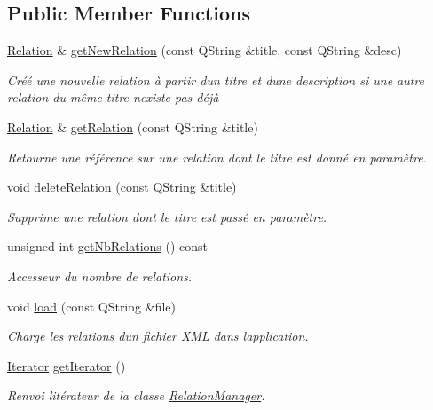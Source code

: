 \subsection*{Public Member Functions}
\begin{DoxyCompactItemize}
\item 
\hyperlink{class_relation}{Relation} \& \hyperlink{class_relation_manager_a1f9d556e0505105205e1fdb4905c4a80}{get\+New\+Relation} (const Q\+String \&title, const Q\+String \&desc)
\begin{DoxyCompactList}\small\item\em Créé une nouvelle relation à partir d\textquotesingle{}un titre et d\textquotesingle{}une description si une autre relation du même titre n\textquotesingle{}existe pas déjà \end{DoxyCompactList}\item 
\hyperlink{class_relation}{Relation} \& \hyperlink{class_relation_manager_ad9ffbaba761149560d915f081d379ecc}{get\+Relation} (const Q\+String \&title)
\begin{DoxyCompactList}\small\item\em Retourne une référence sur une relation dont le titre est donné en paramètre. \end{DoxyCompactList}\item 
void \hyperlink{class_relation_manager_a074413b3ed72a1342821e911c1fa3587}{delete\+Relation} (const Q\+String \&title)
\begin{DoxyCompactList}\small\item\em Supprime une relation dont le titre est passé en paramètre. \end{DoxyCompactList}\item 
\mbox{\label{class_relation_manager_abbd0627b6e986fcc5af94e3c71e0b148}} 
unsigned int \hyperlink{class_relation_manager_abbd0627b6e986fcc5af94e3c71e0b148}{get\+Nb\+Relations} () const
\begin{DoxyCompactList}\small\item\em Accesseur du nombre de relations. \end{DoxyCompactList}\item 
void \hyperlink{class_relation_manager_a37273bc4c1d223bf99ff10ba7feba50a}{load} (const Q\+String \&file)
\begin{DoxyCompactList}\small\item\em Charge les relations d\textquotesingle{}un fichier X\+ML dans l\textquotesingle{}application. \end{DoxyCompactList}\item 
\hyperlink{class_relation_manager_1_1_iterator}{Iterator} \hyperlink{class_relation_manager_a467cb7895b238376feaac142cdec5dab}{get\+Iterator} ()
\begin{DoxyCompactList}\small\item\em Renvoi l\textquotesingle{}itérateur de la classe \hyperlink{class_relation_manager}{Relation\+Manager}. \end{DoxyCompactList}\end{DoxyCompactItemize}
